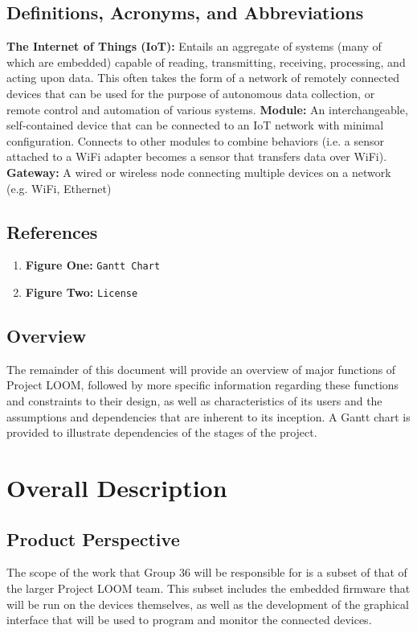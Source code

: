 \documentclass[onecolumn, draftclsnofoot,10pt, compsoc]{IEEEtran}
\begin{document}
	\subsection{Definitions, Acronyms, and Abbreviations}
	\textbf{The Internet of Things (IoT):} Entails an aggregate of systems (many of which are embedded) capable of reading, transmitting, receiving, processing, and acting upon data. This often takes the form of a network of remotely connected devices that can be used for the purpose of autonomous data collection, or remote control and automation of various systems. \newline
	\textbf{Module:} An interchangeable, self-contained device that can be connected to an IoT network with minimal configuration. Connects to other modules to combine behaviors (i.e. a sensor attached to a WiFi adapter becomes a sensor that transfers data over WiFi). \newline
	\textbf{Gateway:} A wired or wireless node connecting multiple devices on a network (e.g. WiFi, Ethernet)

	\subsection{References}
	\begin{enumerate}
		\item \textbf{Figure One:} \texttt{Gantt Chart}
		\item \textbf{Figure Two:} \texttt{License}
	\end{enumerate}
	
	\subsection{Overview}
	The remainder of this document will provide an overview of major functions of Project LOOM, followed by more specific information regarding these functions and constraints to their design, as well as characteristics of its users and the assumptions and dependencies that are inherent to its inception. A Gantt chart is provided to illustrate dependencies of the stages of the project.

\section{Overall Description}
	\subsection{Product Perspective}
	The scope of the work that Group 36 will be responsible for is a subset of that of the larger Project LOOM team. This subset includes the embedded firmware that will be run on the devices themselves, as well as the development of the graphical interface that will be used to program and monitor the connected devices.
\end{document}

